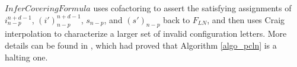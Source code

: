 \documentclass[journal]{IEEEtran}
\begin{document}
$InferCoveringFormula$ uses cofactoring \cite{Cofact} to assert the satisfying assignments of $i_{n-p}^{n+d-1}$,
$(i')_{n-p}^{n+d-1}$, $s_{n-p}$, and $(s')_{n-p}$ back to $F_{LN}$,
and then uses Craig interpolation \cite{interp_McMillan} to characterize a larger set of invalid configuration letters.
More details can be found in \cite{ShengYuShen:iccad11},
which had proved that Algorithm \ref{algo_pcln} is a halting one.
%
%
\end{document}
